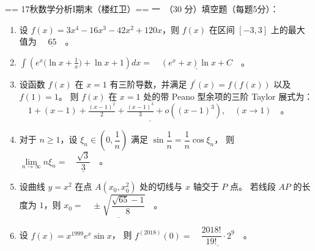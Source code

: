 == 17秋数学分析I期末（楼红卫）==
一\ （30 分）填空题（每题5分）：
\begin{enumerate}[label=(\arabic*)]
\item 设 $f(x)=3 x^{4}-16 x^{3}-42 x^{2}+120 x$，则 $f(x)$ 在区间 $[-3,3]$ 上的最大值为 $\underline{\quad 65 \quad}$。
\item $\displaystyle\int\left(e^{x}\Big(\ln x+\frac{1}{x}\Big)+\ln x+1\right) dx=\underline{\quad \left(e^{x}+x\right) \ln x+C \quad}$。
\item 设函数 $f(x)$ 在 $x=1$ 有三阶导数，并满足 $f^{\prime}(x)=f(f(x))$ 以及 $f(1)=1$。
则 $f(x)$ 在 $x=1$ 处的带 Peano 型余项的三阶 Taylor 展式为：
$\underline{\quad 1+(x-1)+\frac{(x-1)^{2}}{2}+\frac{(x-1)^{3}}{3}+o((x-1)^{3}), \quad(x \rightarrow 1) \quad}$。
\item 对于 $n \geq 1$，设 $\xi_{n} \in\left(0, \dfrac{1}{n}\right)$ 
满足 $\sin \dfrac{1}{n}=\dfrac{1}{n} \cos \xi_{n}$，
则 $\lim\limits_{n \rightarrow \infty} n \xi_{n}=\underline{\quad\dfrac{\sqrt{3}}{3}\quad}$。
\item 设曲线 $y=x^{2}$ 在点 $A(x_{0}, x_{0}^{2})$ 处的切线与 $x$ 轴交于 $P$ 点。
若线段 $AP$ 的长度为 $1$，则 $x_{0}= \underline{\quad \pm \sqrt{\dfrac{\sqrt{65}-1}{8}} \quad}$。
\item 设 $f(x)=x^{1999} e^{x} \sin x$，
则 $f^{(2018)}(0)=\underline{\quad\dfrac{2018!}{19!} \cdot 2^{9}\quad}$。
\end{enumerate}
